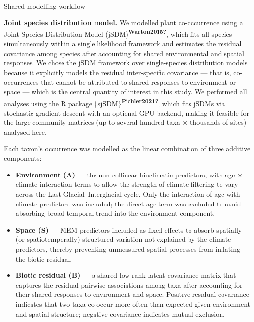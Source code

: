 \documentclass[
  12pt,
]{article}
\makeatletter
\let\oldparagraph\paragraph
\renewcommand{\paragraph}{
    \@ifstar
      \xxxParagraphStar
      \xxxParagraphNoStar
  }
\newcommand{\xxxParagraphStar}[1]{\oldparagraph*{#1}\mbox{}}
\newcommand{\xxxParagraphNoStar}[1]{\oldparagraph{#1}\mbox{}}
\providecommand{\tightlist}{%
  \setlength{\itemsep}{0pt}\setlength{\parskip}{0pt}}
\makeatother
\begin{document}
\paragraph{Shared modelling workflow}\label{shared-modelling-workflow}

\textbf{Joint species distribution model.} We modelled plant
co-occurrence using a Joint Species Distribution Model
(jSDM)\textsuperscript{\textbf{Warton2015?}}, which fits all species
simultaneously within a single likelihood framework and estimates the
residual covariance among species after accounting for shared
environmental and spatial responses. We chose the jSDM framework over
single-species distribution models because it explicitly models the
residual inter-specific covariance --- that is, co-occurrences that
cannot be attributed to shared responses to environment or space ---
which is the central quantity of interest in this study. We performed
all analyses using the R package
\{sjSDM\}\textsuperscript{\textbf{Pichler2021?}}, which fits jSDMs via
stochastic gradient descent with an optional GPU backend, making it
feasible for the large community matrices (up to several hundred taxa ×
thousands of sites) analysed here.

Each taxon's occurrence was modelled as the linear combination of three
additive components:

\begin{itemize}
\tightlist
\item
  \textbf{Environment (A)} --- the non-collinear bioclimatic predictors,
  with age × climate interaction terms to allow the strength of climate
  filtering to vary across the Last Glacial--Interglacial cycle. Only
  the interaction of age with climate predictors was included; the
  direct age term was excluded to avoid absorbing broad temporal trend
  into the environment component.
\item
  \textbf{Space (S)} --- MEM predictors included as fixed effects to
  absorb spatially (or spatiotemporally) structured variation not
  explained by the climate predictors, thereby preventing unmeasured
  spatial processes from inflating the biotic residual.
\item
  \textbf{Biotic residual (B)} --- a shared low-rank latent covariance
  matrix that captures the residual pairwise associations among taxa
  after accounting for their shared responses to environment and space.
  Positive residual covariance indicates that two taxa co-occur more
  often than expected given environment and spatial structure; negative
  covariance indicates mutual exclusion.
\end{itemize}
\end{document}
